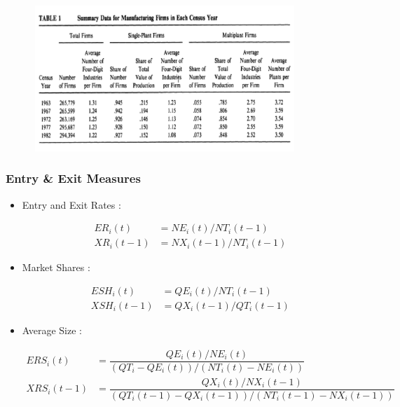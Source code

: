 \documentclass[dvipdfmx,12pt]{beamer}
\begin{document}
\begin{frame}

\begin{center}

\includegraphics[width=12cm,height=5.5cm]{DRS_T1.pdf}

\end{center}

\end{frame}

\begin{frame}\frametitle{Entry \& Exit Measures}

\footnotesize

 \begin{itemize}
 
 \item Entry and Exit Rates :
 
  \begin{align*}
  ER_i(t) &= NE_i(t)/NT_i(t-1) \\
  XR_i(t-1) & = NX_i(t-1) / NT_i(t-1)
  \end{align*} 
 
 \item Market Shares :
 
  \begin{align*}
  ESH_i(t) &=QE_i(t)/NT_i(t-1) \\
  XSH_i(t-1) &= QX_i(t-1) / QT_i(t-1)
  \end{align*}
 
 \item Average Size : 
 
  \begin{align*}
  ERS_i(t) &= \dfrac{QE_i(t)/NE_i(t)}{(QT_i-QE_i(t))/(NT_i(t) - NE_i(t))} \\
  XRS_i(t-1) &=\dfrac{QX_i(t)/NX_i(t-1)}{(QT_i(t-1)-QX_i(t-1))/(NT_i(t-1)-NX_i(t-1))}
  \end{align*}
 
 \end{itemize}

\large

\end{frame}
\end{document}
